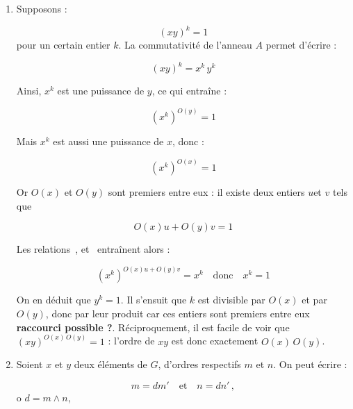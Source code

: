 \begin{sol}
\begin{enumerate}
\item Supposons :

\begin{equation}
(xy)^k=1
\label{}
\end{equation}
pour un certain entier \(k\). %
La commutativit\'e de l'anneau \(A\) permet d'\'ecrire :

\begin{equation}
(xy)^k = x^k\,y^k
\label{}
\end{equation}

Ainsi, \(x^k\) est une puissance de \(y\), ce qui entra\^ine :

\begin{equation}
(x^k)^{O(y)} = 1
\label{eq:xk_oy}
\end{equation}

Mais \(x^k\) est aussi une puissance de \(x\), donc :

\begin{equation}
(x^k)^{O(x)} = 1
\label{eq:xk_ox}
\end{equation}

Or \(O(x)\) et \(O(y)\) sont premiers entre eux : il existe deux entiers \(u\)et \(v\) tels que

\begin{equation}
O(x) u + O(y) v = 1
\label{eq:bezout_oxy}
\end{equation}

Les relations~,  et~ entra\^inent alors :

\begin{equation}
(x^k)^{O(x) u + O(y) v} = x^k \quad \text{donc} \quad x^k = 1
\label{}
\end{equation}

On en d\'eduit que \(y^k=1\). %
Il s'ensuit que \(k\) est divisible par \(O(x)\) et par \(O(y)\), donc par leur produit car ces entiers sont premiers entre eux \textbf{raccourci possible ?}. %
R\'eciproquement, il est facile de voir que \((xy)^{O(x)\,O(y)}=1\) : %
l'ordre de \(xy\) est donc exactement \(O(x)\,O(y)\).

\item Soient \(x\) et \(y\) deux \'el\'ements de \(G\), d'ordres respectifs \(m\) et \(n\). %
On peut \'ecrire :

\begin{equation}
m = dm' \quad\text{et}\quad n=dn'\, ,
\label{}
\end{equation}
o \(d=m\wedge n\), %






\end{enumerate}
\end{sol}
